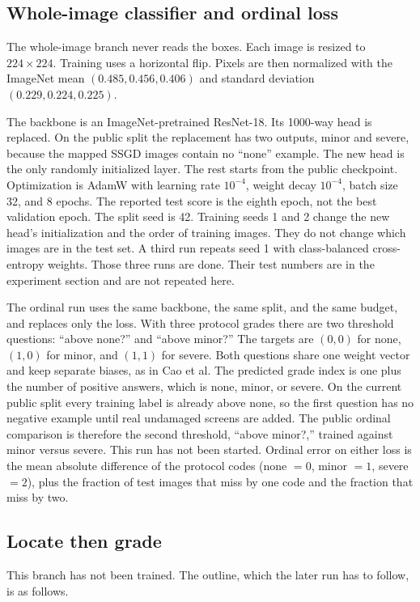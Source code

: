 \documentclass[10pt]{article}
\begin{document}
\subsection{Whole-image classifier and ordinal loss}
The whole-image branch never reads the boxes. Each image is resized to $224\times 224$. Training uses a horizontal flip. Pixels are then normalized with the ImageNet mean $(0.485, 0.456, 0.406)$ and standard deviation $(0.229, 0.224, 0.225)$.

The backbone is an ImageNet-pretrained ResNet-18. Its 1000-way head is replaced. On the public split the replacement has two outputs, minor and severe, because the mapped SSGD images contain no ``none'' example. The new head is the only randomly initialized layer. The rest starts from the public checkpoint. Optimization is AdamW with learning rate $10^{-4}$, weight decay $10^{-4}$, batch size 32, and 8 epochs. The reported test score is the eighth epoch, not the best validation epoch. The split seed is 42. Training seeds 1 and 2 change the new head's initialization and the order of training images. They do not change which images are in the test set. A third run repeats seed 1 with class-balanced cross-entropy weights. Those three runs are done. Their test numbers are in the experiment section and are not repeated here.

The ordinal run uses the same backbone, the same split, and the same budget, and replaces only the loss. With three protocol grades there are two threshold questions: ``above none?'' and ``above minor?'' The targets are $(0,0)$ for none, $(1,0)$ for minor, and $(1,1)$ for severe. Both questions share one weight vector and keep separate biases, as in Cao et al. The predicted grade index is one plus the number of positive answers, which is none, minor, or severe. On the current public split every training label is already above none, so the first question has no negative example until real undamaged screens are added. The public ordinal comparison is therefore the second threshold, ``above minor?,'' trained against minor versus severe. This run has not been started. Ordinal error on either loss is the mean absolute difference of the protocol codes (none $=0$, minor $=1$, severe $=2$), plus the fraction of test images that miss by one code and the fraction that miss by two.

\subsection{Locate then grade}
This branch has not been trained. The outline, which the later run has to follow, is as follows.
\end{document}
